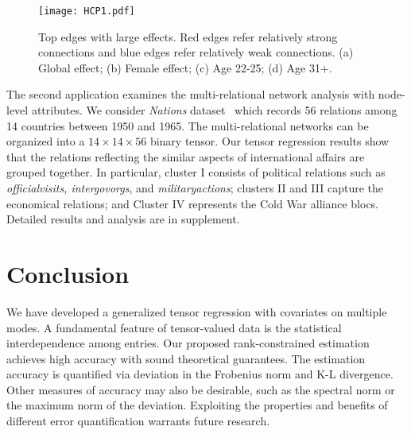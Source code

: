 \documentclass{article}
\theoremstyle{plain}
\theoremstyle{definition}
\begin{document}
\begin{figure}[ht]
\centering
\vspace{-.2cm}
\texttt{[image: HCP1.pdf]}
\caption{\normalsize{Top edges with large effects. Red edges refer relatively strong connections and blue edges refer relatively weak connections. (a) Global effect; (b) Female effect; (c) Age 22-25; (d) Age 31+.} }\label{fig:brain}
\end{figure}
\vspace{-.3cm}
The second application examines the multi-relational network analysis with node-level attributes. We consider \emph{Nations} dataset~\cite{nickel2011three} which records 56 relations among 14 countries between 1950 and 1965. The multi-relational networks can be organized into a $14 \times 14 \times 56$ binary tensor. Our tensor regression results show that the relations reflecting the similar aspects of international affairs are grouped together. In particular, cluster I consists of political relations such as \emph{officialvisits, intergovorgs}, and \emph{militaryactions}; clusters II and III capture the economical relations; and Cluster IV represents the Cold War alliance blocs.  Detailed results and analysis are in supplement.

\vspace{-.3cm}
\section{Conclusion}
\vspace{-.2cm}
We have developed a generalized tensor regression with covariates on multiple modes. A fundamental feature of tensor-valued data is the statistical interdependence among entries. Our proposed rank-constrained estimation achieves high accuracy with sound theoretical guarantees. The estimation accuracy is quantified via deviation in the Frobenius norm and K-L divergence. Other measures of accuracy may also be desirable, such as the spectral norm or the maximum norm of the deviation. Exploiting the properties and benefits of different error quantification warrants future research.



\newpage
\medskip



\end{document}
